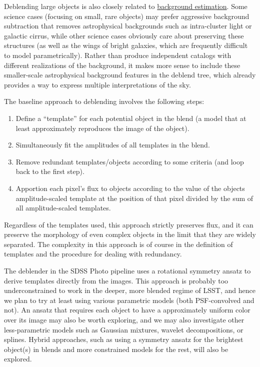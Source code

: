 Deblending large objects is also closely related to \hyperref[sec:acBackgroundEstimation]{background estimation}.  Some science cases (focusing on small, rare objects) may prefer aggressive background subtraction that removes astrophysical backgrounds such as intra-cluster light or galactic cirrus, while other science cases obviously care about preserving these structures (as well as the wings of bright galaxies, which are frequently difficult to model parametrically).  Rather than produce independent catalogs with different realizations of the background, it makes more sense to include these smaller-scale astrophysical background features in the deblend tree, which already provides a way to express multiple interpretations of the sky.

The baseline approach to deblending involves the following steps:
\begin{enumerate}
\item Define a ``template'' for each potential object in the blend (a model that at least approximately reproduces the image of the object).
\item Simultaneously fit the amplitudes of all templates in the blend.
\item Remove redundant templates/objects according to some criteria (and loop back to the first step).
\item Apportion each pixel's flux to objects according to the value of the objects amplitude-scaled template at the position of that pixel divided by the sum of all amplitude-scaled templates.
\end{enumerate}
Regardless of the templates used, this approach strictly preserves flux, and it can preserve the morphology of even complex objects in the limit that they are widely separated.  The complexity in this approach is of course in the definition of templates and the procedure for dealing with redundancy.

The deblender in the SDSS Photo pipeline uses a rotational symmetry ansatz to derive templates directly from the images.  This approach is probably too underconstrained to work in the deeper, more blended regime of LSST, and hence we plan to try at least using various parametric models (both PSF-convolved and not).  An ansatz that requires each object to have a approximately uniform color over its image may also be worth exploring, and we may also investigate other less-parametric models such as Gaussian mixtures, wavelet decompositions, or splines.  Hybrid approaches, such as using a symmetry ansatz for the brightest object(s) in blends and more constrained models for the rest, will also be explored.

